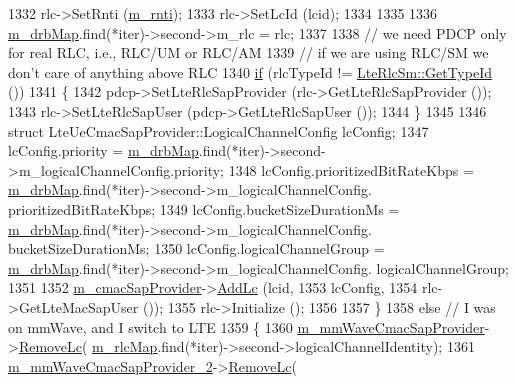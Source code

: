 \begin{DoxyCode}
1332           rlc->SetRnti (\hyperlink{classns3_1_1LteUeRrc_a8e078d8ef0ad23e670fe2ef08caab84f}{m\_rnti});
1333           rlc->SetLcId (lcid);
1334 
1335           
1336           \hyperlink{classns3_1_1LteUeRrc_aa85c5bdde73c2072b2b3053e629bdce0}{m\_drbMap}.find(*iter)->second->m\_rlc = rlc;
1337  
1338           \textcolor{comment}{// we need PDCP only for real RLC, i.e., RLC/UM or RLC/AM}
1339           \textcolor{comment}{// if we are using RLC/SM we don't care of anything above RLC}
1340           \hyperlink{loss__ITU1238_8m_a419d895abe1313c35fa353c93802647e}{if} (rlcTypeId != \hyperlink{classns3_1_1LteRlcSm_a160bd39ce4e0d113dd5d93cc3a258045}{LteRlcSm::GetTypeId} ())
1341             \{
1342               pdcp->SetLteRlcSapProvider (rlc->GetLteRlcSapProvider ()); 
1343               rlc->SetLteRlcSapUser (pdcp->GetLteRlcSapUser ());
1344             \}
1345 
1346           \textcolor{keyword}{struct }LteUeCmacSapProvider::LogicalChannelConfig lcConfig;
1347           lcConfig.priority = \hyperlink{classns3_1_1LteUeRrc_aa85c5bdde73c2072b2b3053e629bdce0}{m\_drbMap}.find(*iter)->second->m\_logicalChannelConfig.priority;
1348           lcConfig.prioritizedBitRateKbps = \hyperlink{classns3_1_1LteUeRrc_aa85c5bdde73c2072b2b3053e629bdce0}{m\_drbMap}.find(*iter)->second->m\_logicalChannelConfig.
      prioritizedBitRateKbps;
1349           lcConfig.bucketSizeDurationMs =   \hyperlink{classns3_1_1LteUeRrc_aa85c5bdde73c2072b2b3053e629bdce0}{m\_drbMap}.find(*iter)->second->m\_logicalChannelConfig.
      bucketSizeDurationMs;
1350           lcConfig.logicalChannelGroup =    \hyperlink{classns3_1_1LteUeRrc_aa85c5bdde73c2072b2b3053e629bdce0}{m\_drbMap}.find(*iter)->second->m\_logicalChannelConfig.
      logicalChannelGroup;
1351 
1352           \hyperlink{classns3_1_1LteUeRrc_a5a7bffd2040d73eb5db1aaef849d0396}{m\_cmacSapProvider}->\hyperlink{classns3_1_1LteUeCmacSapProvider_a62f2d731c336ca14e98e95a3215e92ec}{AddLc} (lcid,
1353                                     lcConfig,
1354                                     rlc->GetLteMacSapUser ());
1355           rlc->Initialize ();
1356 
1357         \}
1358         \textcolor{keywordflow}{else} \textcolor{comment}{// I was on mmWave, and I switch to LTE}
1359         \{
1360           \hyperlink{classns3_1_1LteUeRrc_ac48418b0f235043204868e73c073ec0b}{m\_mmWaveCmacSapProvider}->\hyperlink{classns3_1_1LteUeCmacSapProvider_a4d1b9e67debe6acb4558dcff8788349c}{RemoveLc}(
      \hyperlink{classns3_1_1LteUeRrc_a64b3948cda818827b8774d7a2be7ea4f}{m\_rlcMap}.find(*iter)->second->logicalChannelIdentity);
1361           \hyperlink{classns3_1_1LteUeRrc_ad57849b84ca3da54a2a85ab91c63327b}{m\_mmWaveCmacSapProvider\_2}->\hyperlink{classns3_1_1LteUeCmacSapProvider_a4d1b9e67debe6acb4558dcff8788349c}{RemoveLc}(

\end{DoxyCode}
